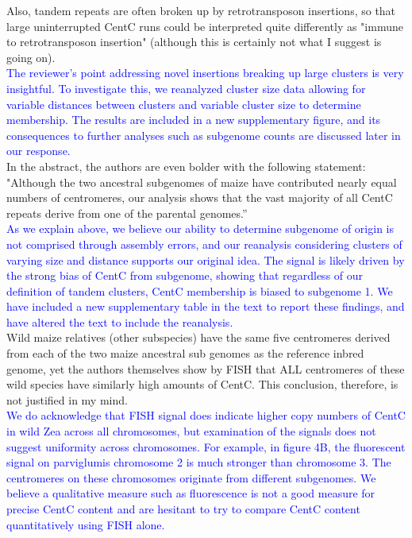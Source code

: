 \documentclass[]{article}
\newcommand{\res}[1]{\noindent \textcolor{blue}{{#1}} \\}
\begin{document}
Also, tandem repeats are often broken up by retrotransposon insertions, so that large uninterrupted CentC runs could be interpreted quite differently as "immune to retrotransposon insertion" (although this is certainly not what I suggest is going on).\\

\res{The reviewer's point addressing novel insertions breaking up large clusters is very insightful.
To investigate this, we reanalyzed cluster size data allowing for variable distances between clusters and variable cluster size to determine membership.
The results are included in a new supplementary figure, and its consequences to further analyses such as subgenome counts are discussed later in our response.}

In the abstract, the authors are even bolder with the following statement: "Although the two ancestral subgenomes of maize have contributed nearly equal numbers of centromeres, our analysis shows that the vast majority of all CentC repeats derive from one of the parental genomes.”\\

\res{As we explain above, we believe our ability to determine subgenome of origin is not comprised through assembly errors, and our reanalysis considering clusters of varying size and distance supports our original idea.
The signal is likely driven by the strong bias of CentC from subgenome, showing that regardless of our definition of tandem clusters, CentC membership is biased to subgenome 1.
We have included a new supplementary table in the text to report these findings, and have altered the text to include the reanalysis.}

Wild maize relatives (other subspecies) have the same five centromeres derived from each of the two maize ancestral sub genomes as the reference inbred genome, yet the authors themselves show by FISH that ALL centromeres of these wild species have similarly high amounts of CentC.   This conclusion, therefore, is not justified in my mind.  \\

\res{We do acknowledge that FISH signal does indicate higher copy numbers of CentC in wild Zea across all chromosomes, but examination of the signals does not suggest uniformity across chromosomes.  
For example, in figure 4B, the fluorescent signal on parviglumis chromosome 2 is much stronger than chromosome 3.  
The centromeres on these chromosomes originate from different subgenomes.  
We believe a qualitative measure such as fluorescence is not a good measure for precise CentC content and are hesitant to try to compare CentC content quantitatively using FISH alone.}
\end{document}
